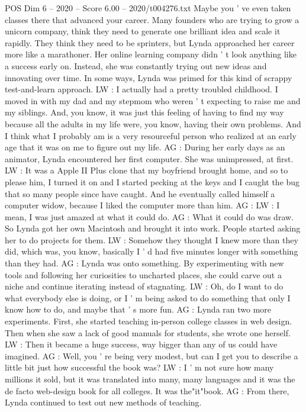 \begin{textsample}{POS Dim 6 – 2020 – Score 6.00 – 2020/t004276.txt}
Maybe you ' ve even taken classes there that advanced your career.
Many founders who are trying to grow a unicorn company, think they need to generate one brilliant idea and scale it rapidly.
They think they need to be sprinters, but Lynda approached her career more like a marathoner.
Her online learning company didn ' t look anything like a success early on.
Instead, she was constantly trying out new ideas and innovating over time.
In some ways, Lynda was primed for this kind of scrappy test-and-learn approach.
LW : I actually had a pretty troubled childhood.
I moved in with my dad and my stepmom who weren ' t expecting to raise me and my siblings.
And, you know, it was just this feeling of having to find my way because all the adults in my life were, you know, having their own problems.
And I think what I probably am is a very resourceful person who realized at an early age that it was on me to figure out my life.
AG : During her early days as an animator, Lynda encountered her first computer.
She was unimpressed, at first.
LW : It was a Apple II Plus clone that my boyfriend brought home, and so to please him, I turned it on and I started pecking at the keys and I caught the bug that so many people since have caught.
And he eventually called himself a computer widow, because I liked the computer more than him.
AG : LW : I mean, I was just amazed at what it could do.
AG : What it could do was draw.
So Lynda got her own Macintosh and brought it into work.
People started asking her to do projects for them.
LW : Somehow they thought I knew more than they did, which was, you know, basically I ' d had five minutes longer with something than they had.
AG : Lynda was onto something.
By experimenting with new tools and following her curiosities to uncharted places, she could carve out a niche and continue iterating instead of stagnating.
LW : Oh, do I want to do what everybody else is doing, or I ' m being asked to do something that only I know how to do, and maybe that ' s more fun.
AG : Lynda ran two more experiments.
First, she started teaching in-person college classes in web design.
Then when she saw a lack of good manuals for students, she wrote one herself.
LW : Then it became a huge success, way bigger than any of us could have imagined.
AG : Well, you ' re being very modest, but can I get you to describe a little bit just how successful the book was?
LW : I ' m not sure how many millions it sold, but it was translated into many, many languages and it was the de facto web-design book for all colleges.
It was the"it"book.
AG : From there, Lynda continued to test out new methods of teaching.

\end{textsample}
